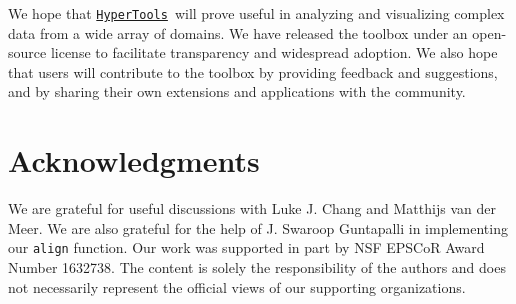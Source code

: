 \documentclass[12pt,letterpaper]{article}
\newcommand{\hypertools}{\href{https://github.com/ContextLab/hypertools}{\texttt{HyperTools}}}
\begin{document}
We hope that \hypertools~will prove useful in analyzing and visualizing complex data from a wide array of domains.  We have released the toolbox under an open-source license to facilitate transparency and widespread adoption.  We also hope that users will contribute to the toolbox by providing feedback and suggestions, and by sharing their own extensions and applications with the community.




\section*{Acknowledgments}
We are grateful for useful discussions with Luke J. Chang and Matthijs van der Meer.  We are also grateful for the help of J. Swaroop Guntapalli in implementing our \texttt{align} function. Our work was supported in part by NSF EPSCoR Award Number 1632738.  The content is solely the responsibility of the authors and does not necessarily represent the official views of our supporting organizations.
\nolinenumbers




\end{document}
